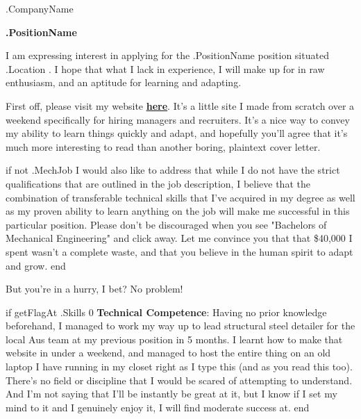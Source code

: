 \documentclass[10pt]{letter}
\begin{document}


\thispagestyle{empty}

\address{Deon Chen \\
    i.am.deon.chen@gmail.com \\ 
    (+61) 0430 342 826
}

\begin{letter}{
    {{ .CompanyName }}
} 

\signature{Deon}

\opening{}

\textbf{
    {{ .PositionName }} 
}


I am expressing interest in applying for the {{ .PositionName }} position situated {{ .Location }}. I hope that what I lack in experience, I will make up for in raw enthusiasm, and an aptitude for learning and adapting. 

First off, please visit my website \underline{\textbf{\href{https://zabuzabuzazaa.xyz/home/dear_recruiters/}{here}}}. It's a little site I made from scratch over a weekend specifically for hiring managers and recruiters. It's a nice way to convey my ability to learn things quickly and adapt, and hopefully you'll agree that it's much more interesting to read than another boring, plaintext cover letter. 

{{ if not .MechJob }}
I would also like to address that while I do not have the strict qualifications that are outlined in the job description, I believe that the combination of transferable technical skills that I've acquired in my degree as well as my proven ability to learn anything on the job will make me successful in this particular position. Please don't be discouraged when you see "Bachelors of Mechanical Engineering" and click away. Let me convince you that that \$40,000 I spent wasn't a complete waste, and that you believe in the human spirit to adapt and grow. 
{{ end }}

But you're in a hurry, I bet? No problem!

{{ if getFlagAt .Skills 0 }} %
\textbf{Technical Competence}: Having no prior knowledge beforehand, I managed to work my way up to lead structural steel detailer for the local Aus team at my previous position in 5 months. I learnt how to make that website in under a weekend, and managed to host the entire thing on an old laptop I have running in my closet right as I type this (and as you read this too). There's no field or discipline that I would be scared of attempting to understand. And I'm not saying that I'll be instantly be great at it, but I know if I set my mind to it and I genuinely enjoy it, I will find moderate success at. 
{{ end }}


\end{letter}
\end{document}
